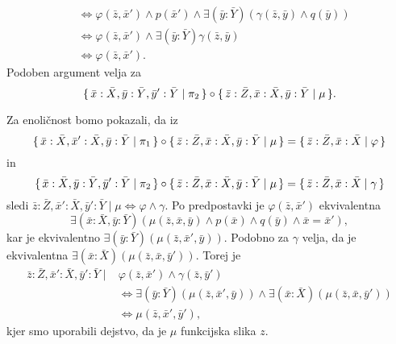 \documentclass[../kategoricna_logika.tex]{subfiles}
\begin{document}
\begin{dokaz}
\begin{enumerate}[label=(\roman*)]
\begin{align*}
      &\iff \varphi(\bar{z},\bar{x}') \land p(\bar{x}') \land \exists (\bar{y}:\bar{Y})(\gamma(\bar{z},\bar{y}) \land q(\bar{y})) \\
      &\iff \varphi(\bar{z},\bar{x}') \land \exists (\bar{y}:\bar{Y}) \gamma(\bar{z},\bar{y}) \\
      &\iff \varphi(\bar{z},\bar{x}').
    \end{align*}
    Podoben argument velja za
    $$\lbrace\,\bar{x}:\bar{X},\bar{y}:\bar{Y},\bar{y}':\bar{Y} \mid  \pi_2\,\rbrace \circ
    \lbrace\,\bar{z}:\bar{Z},\bar{x}:\bar{X},\bar{y}:\bar{Y} \mid \mu\,\rbrace.$$

    Za enoličnost bomo pokazali, da iz
    $$\lbrace\,\bar{x}:\bar{X}, \bar{x}':\bar{X}, \bar{y}:\bar{Y} \mid \pi_1\,\rbrace \circ
    \lbrace\,\bar{z}:\bar{Z},\bar{x}:\bar{X},\bar{y}:\bar{Y} \mid \mu\,\rbrace =
    \lbrace\,\bar{z}:\bar{Z},\bar{x}:\bar{X} \mid \varphi\,\rbrace$$
    in
    $$\lbrace\,\bar{x}:\bar{X},\bar{y}:\bar{Y},\bar{y}':\bar{Y} \mid  \pi_2\,\rbrace \circ
    \lbrace\,\bar{z}:\bar{Z},\bar{x}:\bar{X},\bar{y}:\bar{Y} \mid \mu\,\rbrace =
    \lbrace\,\bar{z}:\bar{Z},\bar{x}:\bar{X} \mid \gamma\,\rbrace$$
    sledi
    $\bar{z}:\bar{Z},\bar{x}':\bar{X},\bar{y}':\bar{Y} \mid \mu \iff \varphi \land \gamma$.  Po
    predpostavki je $\varphi(\bar{z},\bar{x}')$ ekvivalentna
    \[ \exists (\bar{x}:\bar{X},\bar{y}:\bar{Y}) (\mu(\bar{z},\bar{x},\bar{y}) \land p(\bar{x}) \land q(\bar{y}) \land \bar{x}=\bar{x}'),\]
    kar
    je ekvivalentno $\exists (\bar{y}:\bar{Y})(\mu(\bar{z},\bar{x}',\bar{y}))$.  Podobno za $\gamma$
    velja, da je ekvivalentna $\exists (\bar{x}:\bar{X})(\mu(\bar{z},\bar{x},\bar{y}'))$. Torej je
    \begin{align*}
      \bar{z}:\bar{Z}, \bar{x}':\bar{X},\bar{y}':\bar{Y} \mid& \varphi(\bar{z},\bar{x}') \land \gamma(\bar{z},\bar{y}') \\
      &\iff \exists (\bar{y}:\bar{Y})(\mu(\bar{z},\bar{x}',\bar{y})) \land \exists (\bar{x}:\bar{X})(\mu(\bar{z},\bar{x},\bar{y}')) \\
                                       &\iff \mu(\bar{z},\bar{x}',\bar{y}'),
    \end{align*}
    kjer smo uporabili dejstvo, da je $\mu$ funkcijska slika $z$.


\end{enumerate}
\end{dokaz}
\end{document}
